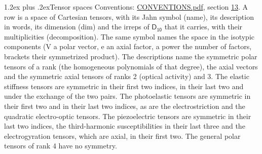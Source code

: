 \documentclass[10pt,a4paper]{article}
\makeatletter
\renewcommand\section{\@startsection{section}{1}{\z@}{-3ex plus -1ex minus -.2ex}%
  {1.2ex plus .2ex}{\normalfont\large\sffamily\bfseries\color{parttitle}}}
\numberwithin{equation}{section}
\newcommand{\grp}[1]{\mathsf{#1}}
\makeatother
\begin{document}
\section{Tensor spaces}\label{s:tensor_spaces}
Conventions: \href{../../CONVENTIONS.pdf}{CONVENTIONS.pdf}, section \href{../../CONVENTIONS.pdf\#conv.13}{13}.
\leavevmode\label{n:head.name}\label{n:head.description}\label{n:head.dim}\label{n:head.decomposition}A row is a space of Cartesian tensors, with its Jahn symbol (name), its description in words, its dimension (dim) and the irreps of $\grp{D_{10}}$ that it carries, with their multiplicities (decomposition). \label{n:label.jahn}The same symbol names the space in the isotypic components (V a polar vector, e an axial factor, a power the number of factors, brackets their symmetrized product). The descriptions name the symmetric polar tensors of a rank (the homogeneous polynomials of that degree), the axial vectors and the symmetric axial tensors of ranks 2 (optical activity) and 3. The elastic stiffness tensors are symmetric in their first two indices, in their last two and under the exchange of the two pairs. The photoelastic tensors are symmetric in their first two and in their last two indices, as are the electrostriction and the quadratic electro-optic tensors. The piezoelectric tensors are symmetric in their last two indices, the third-harmonic susceptibilities in their last three and the electrogyration tensors, which are axial, in their first two. The general polar tensors of rank 4 have no symmetry.
\end{document}
